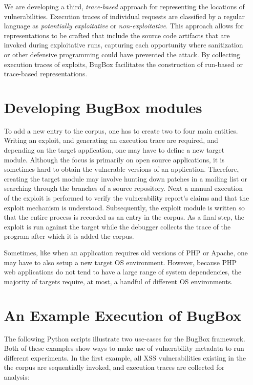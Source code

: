 \documentclass[letterpaper,twocolumn,10pt]{article}
\begin{document}
We are developing a third, \textit{trace-based} approach for representing the locations of vulnerabilities. Execution traces of individual requests are classified by a regular language as \emph{potentially exploitative} or \emph{non-exploitative}. This approach allows for representations to be crafted that include the source code artifacts that are invoked during exploitative runs, capturing each opportunity where sanitization or other defensive programming could have prevented the attack. By collecting execution traces of exploits, BugBox facilitates the construction of run-based or trace-based representations.

\section{Developing BugBox modules}

To add a new entry to the corpus, one has to create two to four main entities. Writing an exploit, and generating an execution trace are required, and depending on the target application, one may have to define a new target module.  Although the focus is primarily on open source applications, it is sometimes hard to obtain the vulnerable versions of an application. Therefore, creating the target module may involve hunting down patches in a mailing list or searching through the branches of a source repository. Next a manual execution of the exploit is performed to verify the vulnerability report's claims and that the exploit mechanism is understood. Subsequently, the exploit module is written so that the entire process is recorded as an entry in the corpus. As a final step, the exploit is run against the target while the debugger collects the trace of the program after which it is added the corpus.\par

Sometimes, like when an application requires old versions of PHP or Apache, one may have to also setup a new target OS environment. However, because PHP web applications do not tend to have a large range of system dependencies, the majority of targets require, at most, a handful of different OS environments. \par

\section {An Example Execution of BugBox}

The following Python scripts illustrate two use-cases for the BugBox framework. Both of these examples show ways to make use of vulnerability metadata to run different experiments. In the first example, all XSS vulnerabilities existing in the the corpus are sequentially invoked, and execution traces are collected for analysis:
\end{document}
